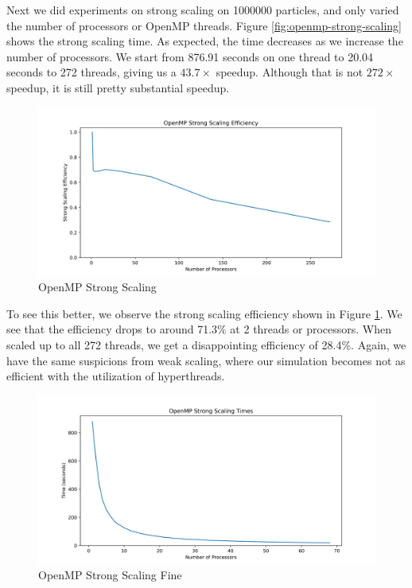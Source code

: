 \documentclass{article}
\begin{document}
Next we did experiments on strong scaling on 1000000 particles, and only varied the number of processors or OpenMP threads. Figure \ref{fig:openmp-strong-scaling} shows the strong scaling time. As expected, the time decreases as we increase the number of processors. We start from 876.91 seconds on one thread to 20.04 seconds to 272 threads, giving us a $43.7\times$ speedup. Although that is not $272\times$ speedup, it is still pretty substantial speedup.

\begin{figure}[H]
	\centering
	\includegraphics[width=6in]{figures/openmp_strong_scaling_efficiency.png}
	\caption{OpenMP Strong Scaling}
	\label{fig:openmp-strong-scaling-efficiency}
\end{figure}

To see this better, we observe the strong scaling efficiency shown in Figure \ref{fig:openmp-strong-scaling-efficiency}. We see that the efficiency drops to around 71.3\% at 2 threads or processors. When scaled up to all 272 threads, we get a disappointing efficiency of 28.4\%. Again, we have the same suspicions from weak scaling, where our simulation becomes not as efficient with the utilization of hyperthreads.

\begin{figure}[H]
	\centering
	\includegraphics[width=6in]{figures/openmp_strong_scaling_times_fine.png}
	\caption{OpenMP Strong Scaling Fine}
	\label{fig:openmp-strong-scaling-fine}
\end{figure}
\end{document}
